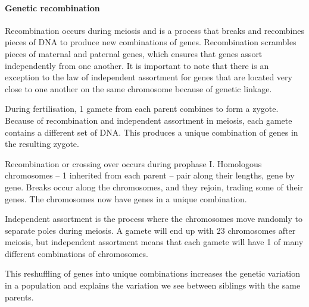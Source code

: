 \paragraph{Genetic recombination}
Recombination occurs during meiosis and is a process that breaks and recombines pieces of DNA to produce new combinations of genes.
Recombination scrambles pieces of maternal and paternal genes, which ensures that genes assort independently from one another. 
It is important to note that there is an exception to the law of independent assortment for genes that are located very close to one another on the same chromosome because of genetic linkage.

During fertilisation, 1 gamete from each parent combines to form a zygote. Because of recombination and independent assortment in meiosis, each gamete contains a different set of DNA. This produces a unique combination of genes in the resulting zygote.

Recombination or crossing over occurs during prophase I. Homologous chromosomes – 1 inherited from each parent – pair along their lengths, gene by gene. 
Breaks occur along the chromosomes, and they rejoin, trading some of their genes. The chromosomes now have genes in a unique combination.

Independent assortment is the process where the chromosomes move randomly to separate poles during meiosis. 
A gamete will end up with 23 chromosomes after meiosis, but independent assortment means that each gamete will have 1 of many different combinations of chromosomes.

This reshuffling of genes into unique combinations increases the genetic variation in a population and explains the variation we see between siblings with the same parents.



